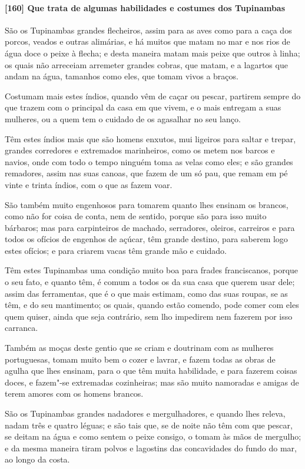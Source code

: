 \begin{linenumbers}
\paragraph{[160] Que trata de algumas habilidades e costumes dos Tupinambas}\quad
São os Tupinambas grandes flecheiros, assim para as aves como para a caça dos porcos,
veados e outras alimárias, e há muitos que matam no mar e nos rios de água doce o peixe à
flecha; e desta maneira matam mais peixe que outros à linha; os quais não arreceiam
arremeter grandes cobras, que matam, e a lagartos que andam na água, tamanhos como eles,
que tomam vivos a braços.

Costumam mais estes índios, quando vêm de caçar ou pescar, partirem sempre do que trazem
com o principal da casa em que vivem, e o mais entregam a suas mulheres, ou a quem tem o
cuidado de os agasalhar no seu lanço.

Têm estes índios mais que são homens enxutos, mui ligeiros para saltar e trepar, grandes
corredores e extremados marinheiros, como os metem nos barcos e navios, onde com todo o
tempo ninguém toma as velas como eles; e são grandes remadores, assim nas suas canoas, que
fazem de um só pau, que remam em pé vinte e trinta índios, com o que as fazem voar.

São também muito engenhosos para tomarem quanto lhes ensinam os brancos, como não for
coisa de conta, nem de sentido, porque são para isso muito bárbaros; mas para carpinteiros
de machado, serradores, oleiros, carreiros e para todos os ofícios de engenhos de açúcar,
têm grande destino, para saberem logo estes ofícios; e para criarem vacas têm grande mão e
cuidado.

Têm estes Tupinambas uma condição muito boa para frades franciscanos, porque o seu fato, e
quanto têm, é comum a todos os da sua casa que querem usar dele; assim das ferramentas,
que é o que mais estimam, como das suas roupas, se as têm, e do seu mantimento; os quais,
quando estão comendo, pode comer com eles quem quiser, ainda que seja contrário, sem lho
impedirem nem fazerem por isso carranca.

Também as moças deste gentio que se criam e doutrinam com as mulheres portuguesas, tomam
muito bem o cozer e lavrar, e fazem todas as obras de agulha que lhes ensinam, para o que
têm muita habilidade, e para fazerem coisas doces, e fazem"-se extremadas cozinheiras; mas
são muito namoradas e amigas de terem amores com os homens brancos.

São os Tupinambas grandes nadadores e mergulhadores, e quando lhes releva, nadam três e
quatro léguas; e são tais que, se de noite não têm com que pescar, se deitam na água e
como sentem o peixe consigo, o tomam às mãos de mergulho; e da mesma maneira tiram polvos
e lagostins das concavidades do fundo do mar, ao longo da costa.


\end{linenumbers}
